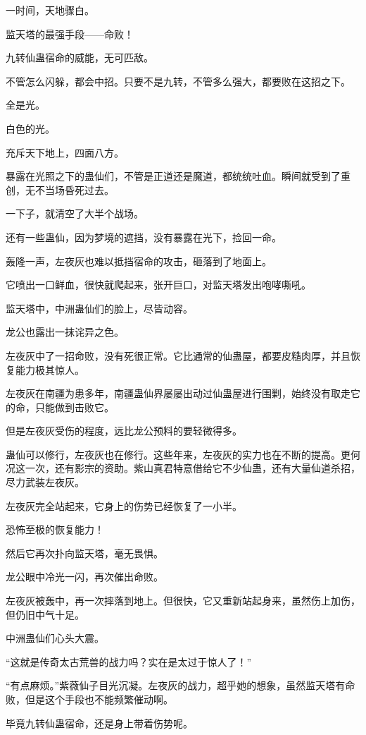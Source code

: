 \begin{this_body}
一时间，天地骤白。

监天塔的最强手段——命败！

九转仙蛊宿命的威能，无可匹敌。

不管怎么闪躲，都会中招。只要不是九转，不管多么强大，都要败在这招之下。

全是光。

白色的光。

充斥天下地上，四面八方。

暴露在光照之下的蛊仙们，不管是正道还是魔道，都统统吐血。瞬间就受到了重创，无不当场昏死过去。

一下子，就清空了大半个战场。

还有一些蛊仙，因为梦境的遮挡，没有暴露在光下，捡回一命。

轰隆一声，左夜灰也难以抵挡宿命的攻击，砸落到了地面上。

它喷出一口鲜血，很快就爬起来，张开巨口，对监天塔发出咆哮嘶吼。

监天塔中，中洲蛊仙们的脸上，尽皆动容。

龙公也露出一抹诧异之色。

左夜灰中了一招命败，没有死很正常。它比通常的仙蛊屋，都要皮糙肉厚，并且恢复能力极其惊人。

左夜灰在南疆为患多年，南疆蛊仙界屡屡出动过仙蛊屋进行围剿，始终没有取走它的命，只能做到击败它。

但是左夜灰受伤的程度，远比龙公预料的要轻微得多。

蛊仙可以修行，左夜灰也在修行。这些年来，左夜灰的实力也在不断的提高。更何况这一次，还有影宗的资助。紫山真君特意借给它不少仙蛊，还有大量仙道杀招，尽力武装左夜灰。

左夜灰完全站起来，它身上的伤势已经恢复了一小半。

恐怖至极的恢复能力！

然后它再次扑向监天塔，毫无畏惧。

龙公眼中冷光一闪，再次催出命败。

左夜灰被轰中，再一次摔落到地上。但很快，它又重新站起身来，虽然伤上加伤，但仍旧中气十足。

中洲蛊仙们心头大震。

“这就是传奇太古荒兽的战力吗？实在是太过于惊人了！”

“有点麻烦。”紫薇仙子目光沉凝。左夜灰的战力，超乎她的想象，虽然监天塔有命败，但是这个手段也不能频繁催动啊。

毕竟九转仙蛊宿命，还是身上带着伤势呢。

\end{this_body}

